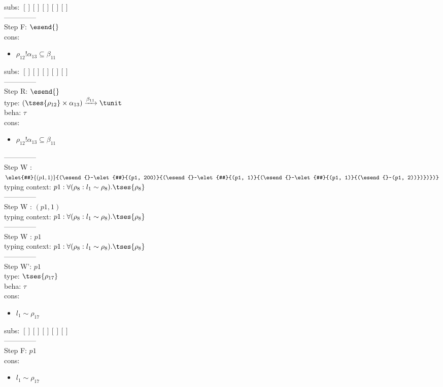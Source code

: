\documentclass[12pt]{article}
\begin{document}
  subs:  $ [ ] [] [] [] [] $  
 \\--------------\\ 
Step F: $ \esend{} $
 \\ cons: \begin{itemize}
\item $ \rho_{12}!\alpha_{13} \subseteq \beta_{11} $
\end{itemize}
 subs:  $ [ ] [] [] [] [] $ 
  \\--------------\\ 
Step R: $ \esend{} $\\
  type: $ ( \tses{ \rho_{12}} \times \alpha_{13}) \xrightarrow{\beta_{11}} \tunit $ 
\\  beha: $ \tau $ 
\\  cons: \begin{itemize}
\item $ \rho_{12}!\alpha_{13} \subseteq \beta_{11} $
\end{itemize} 
  --------------\\ 
Step W : $ \elet{#}{(p1, 1)}{(\esend{}~\elet{#}{(p1, 200)}{(\esend{}~\elet{#}{(p1, 1)}{(\esend{}~\elet{#}{(p1, 1)}{(\esend{}~(p1, 2))})})})} $\\
 typing context: $ p1:\forall (\rho_{8} : l_{1} \sim\rho_{8}).  \tses{ \rho_{8}}$ 
\\ --------------\\
Step W : $ (p1, 1) $\\
 typing context: $ p1:\forall (\rho_{8} : l_{1} \sim\rho_{8}).  \tses{ \rho_{8}}$ 
\\ --------------\\
Step W : $ p1 $\\
 typing context: $ p1:\forall (\rho_{8} : l_{1} \sim\rho_{8}).  \tses{ \rho_{8}}$ 
\\ --------------\\
Step W': $ p1 $\\
  type: $  \tses{ \rho_{17}} $ 
\\  beha: $ \tau $ 
\\  cons: \begin{itemize}
\item $ l_{1} \sim\rho_{17} $
\end{itemize} 
  subs:  $ [ ] [] [] [] [] $  
 \\--------------\\ 
Step F: $ p1 $
 \\ cons: \begin{itemize}
\item $ l_{1} \sim\rho_{17} $
\end{itemize}
\end{document}
